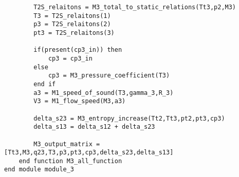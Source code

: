 \begin{verbatim}
        T2S_relaitons = M3_total_to_static_relations(Tt3,p2,M3)
        T3 = T2S_relaitons(1)
        p3 = T2S_relaitons(2)
        pt3 = T2S_relaitons(3)

        if(present(cp3_in)) then
            cp3 = cp3_in
        else
            cp3 = M3_pressure_coefficient(T3)
        end if
        a3 = M1_speed_of_sound(T3,gamma_3,R_3)
        V3 = M1_flow_speed(M3,a3)

        delta_s23 = M3_entropy_increase(Tt2,Tt3,pt2,pt3,cp3)
        delta_s13 = delta_s12 + delta_s23

        M3_output_matrix = [Tt3,M3,q23,T3,p3,pt3,cp3,delta_s23,delta_s13]
    end function M3_all_function
end module module_3
\end{verbatim}